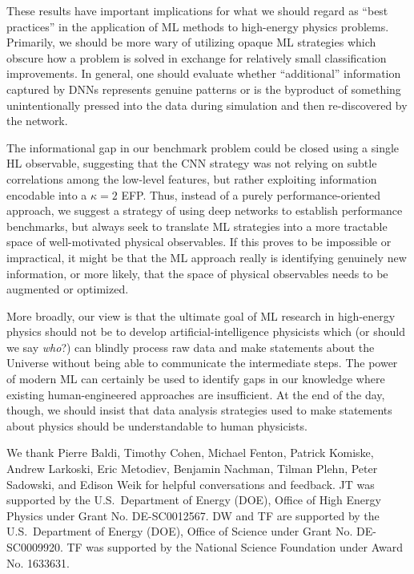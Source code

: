 \documentclass[aps,prd,twocolumn,superscriptaddress,preprintnumbers,nofootinbib,longbibliography,floatfix]{revtex4-1}
\begin{document}
These results have important implications for what we should regard as ``best practices'' in the application of ML methods to high-energy physics problems. Primarily, we should be more wary of utilizing opaque ML strategies which obscure how a problem is solved in exchange for relatively small classification improvements. In general, one should evaluate whether ``additional'' information captured by DNNs represents genuine patterns or is the byproduct of something unintentionally pressed into the data during simulation and then re-discovered by the network.

The informational gap in our benchmark problem could be closed using a single HL observable, suggesting that the CNN strategy was not relying on subtle correlations among the low-level  features, but rather exploiting information encodable into a $\kappa = 2$ EFP. Thus, instead of a purely performance-oriented approach, we suggest a strategy of using deep networks to establish performance benchmarks, but always seek to translate ML strategies into a more tractable space of well-motivated physical observables. If this proves to be impossible or impractical, it might be that the ML approach really is identifying genuinely new information, or more likely, that the space of physical observables needs to be augmented or optimized. 

More broadly, our view is that the ultimate goal of ML research in high-energy physics should not be to develop artificial-intelligence physicists which (or should we say \emph{who}?) can blindly process raw data and make statements about the Universe without being able to communicate the intermediate steps. The power of modern ML can certainly be used to identify gaps in our knowledge where existing human-engineered approaches are insufficient. At the end of the day, though, we should insist that data analysis strategies used to make statements about physics should be understandable to human physicists.

\begin{acknowledgments}
	We thank Pierre Baldi, Timothy Cohen, Michael Fenton, Patrick Komiske, Andrew Larkoski, Eric Metodiev, Benjamin Nachman, Tilman Plehn, Peter Sadowski, and Edison Weik for helpful conversations and feedback. JT was supported by the U.S.\ Department of Energy (DOE), Office of High Energy Physics under Grant No. DE-SC0012567. DW and TF are supported by the U.S.\ Department of Energy (DOE), Office of Science under Grant No. DE-SC0009920. TF was supported by the National Science Foundation under Award No. 1633631.
\end{acknowledgments}
\end{document}
